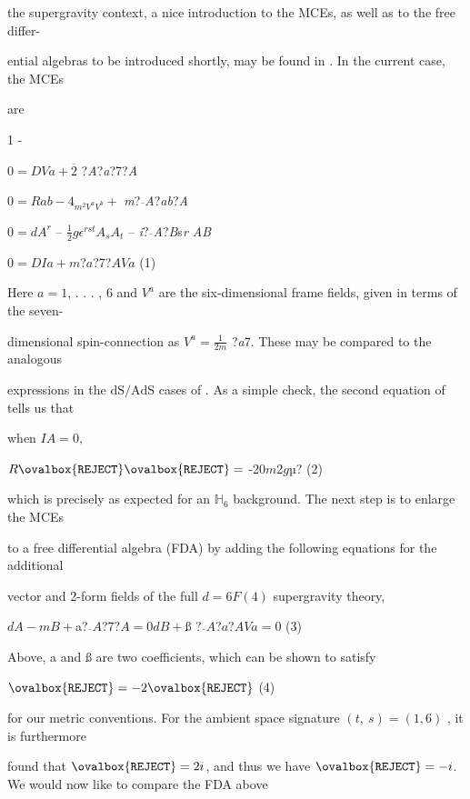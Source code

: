 \documentclass[a4paper,12pt]{article}
\begin{document}
the supergravity context, a nice introduction to the MCEs, as well as to the free differ-

ential algebras to be introduced shortly, may be found in . In the current case, the MCEs

are
\begin{center}
1 -
\end{center}
$0 = DV a + \overline{2}$ ?{\it A}?{\it a}?7?{\it A}

$0 =Rab - 4_{m^{2}V^{a}V^{b}} +$ {\it m}?$\overline{}${\it A}?{\it ab}?{\it A}

$0 = dA^{r}$ -- $\displaystyle \frac{1}{2}g\epsilon^{rst}A_{s}A_{t}$ -- {\it i}?$\overline{}${\it A}?{\it B}s{\it r AB}
\begin{center}
$0 =DI a +m$?$a$?7?$AVa$   (1)
\end{center}
Here $a= 1$, . . . , 6 and $V^{a}$ are the six-dimensional frame fields, given in terms of the seven-

dimensional spin-connection as $V^{a} = \displaystyle \frac{1}{2m}$ ?{\it a}7. These may be compared to the analogous

expressions in the $\mathrm{d}\mathrm{S}/\mathrm{A}\mathrm{d}\mathrm{S}$ cases of . As a simple check, the second equation of tells us that

when $I A=0,$
\begin{center}
$R\ovalbox{\tt\small REJECT}\ovalbox{\tt\small REJECT}=$ -20$m$2$g$µ?   (2)
\end{center}
which is precisely as expected for an $\mathbb{H}_{6}$ background. The next step is to enlarge the MCEs

to a free differential algebra (FDA) by adding the following equations for the additional

vector and 2-form fields of the full $d=6F(4)$ supergravity theory,
\begin{center}
$dA-mB +$a?$\overline {}A$?7?$A =0 dB +$ß ?$\overline {}A$?$a$?$AV a=0$   (3)
\end{center}
Above, a and ß are two coefficients, which can be shown to satisfy
\begin{center}
$\ovalbox{\tt\small REJECT}=- 2\ovalbox{\tt\small REJECT}$   (4)
\end{center}
for our metric conventions. For the ambient space signature $(t,\ s)=(1,6)$ , it is furthermore

found that $\ovalbox{\tt\small REJECT}=2i$, and thus we have $\ovalbox{\tt\small REJECT}=-i$. We would now like to compare the FDA above
\end{document}
